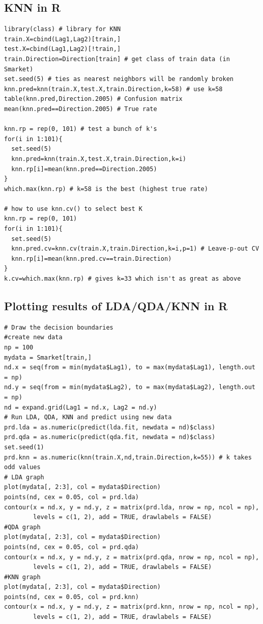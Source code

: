 \documentclass[11pt]{article}
\begin{document}
\subsection{KNN in R}
\begin{lstlisting}
library(class) # library for KNN
train.X=cbind(Lag1,Lag2)[train,]
test.X=cbind(Lag1,Lag2)[!train,]
train.Direction=Direction[train] # get class of train data (in Smarket)
set.seed(5) # ties as nearest neighbors will be randomly broken
knn.pred=knn(train.X,test.X,train.Direction,k=58) # use k=58
table(knn.pred,Direction.2005) # Confusion matrix
mean(knn.pred==Direction.2005) # True rate

knn.rp = rep(0, 101) # test a bunch of k's
for(i in 1:101){
  set.seed(5)
  knn.pred=knn(train.X,test.X,train.Direction,k=i)
  knn.rp[i]=mean(knn.pred==Direction.2005)
}
which.max(knn.rp) # k=58 is the best (highest true rate)

# how to use knn.cv() to select best K
knn.rp = rep(0, 101)
for(i in 1:101){
  set.seed(5)
  knn.pred.cv=knn.cv(train.X,train.Direction,k=i,p=1) # Leave-p-out CV
  knn.rp[i]=mean(knn.pred.cv==train.Direction)
}
k.cv=which.max(knn.rp) # gives k=33 which isn't as great as above
\end{lstlisting}

\subsection{Plotting results of LDA/QDA/KNN in R}
\begin{lstlisting}
# Draw the decision boundaries
#create new data
np = 100
mydata = Smarket[train,]
nd.x = seq(from = min(mydata$Lag1), to = max(mydata$Lag1), length.out = np)
nd.y = seq(from = min(mydata$Lag2), to = max(mydata$Lag2), length.out = np)
nd = expand.grid(Lag1 = nd.x, Lag2 = nd.y)
# Run LDA, QDA, KNN and predict using new data
prd.lda = as.numeric(predict(lda.fit, newdata = nd)$class)
prd.qda = as.numeric(predict(qda.fit, newdata = nd)$class)
set.seed(1)
prd.knn = as.numeric(knn(train.X,nd,train.Direction,k=55)) # k takes odd values
# LDA graph
plot(mydata[, 2:3], col = mydata$Direction)
points(nd, cex = 0.05, col = prd.lda)
contour(x = nd.x, y = nd.y, z = matrix(prd.lda, nrow = np, ncol = np), 
        levels = c(1, 2), add = TRUE, drawlabels = FALSE)
#QDA graph
plot(mydata[, 2:3], col = mydata$Direction)
points(nd, cex = 0.05, col = prd.qda)
contour(x = nd.x, y = nd.y, z = matrix(prd.qda, nrow = np, ncol = np), 
        levels = c(1, 2), add = TRUE, drawlabels = FALSE)
#KNN graph
plot(mydata[, 2:3], col = mydata$Direction)
points(nd, cex = 0.05, col = prd.knn)
contour(x = nd.x, y = nd.y, z = matrix(prd.knn, nrow = np, ncol = np), 
        levels = c(1, 2), add = TRUE, drawlabels = FALSE)
\end{lstlisting}
\end{document}
